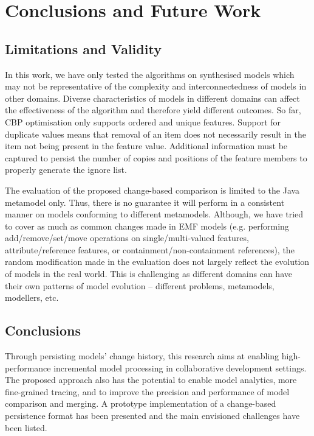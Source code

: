 \chapter{Conclusions and Future Work}

\section{Limitations and Validity}
\label{sec:limitation_and_Threat_to_validity}
In this work, we have only tested the algorithms on synthesised  models which may not be representative of the complexity and interconnectedness of models in other domains. Diverse characteristics of models in different domains can affect the effectiveness of the algorithm and therefore yield different outcomes. So far, CBP optimisation only supports ordered and unique features. Support for duplicate values means that removal of an item does not necessarily result in the item not being present in the feature value. Additional information must be captured to persist the number of copies and positions of the feature members to properly generate the ignore list. 

The evaluation of the proposed change-based comparison is limited to the Java metamodel only. Thus, there is no guarantee it will perform in a consistent manner on models conforming to different metamodels. Although, we have tried to cover as much as common changes made in EMF models (e.g. performing \textsf{add}/\textsf{remove}/\textsf{set}/\textsf{move} operations on \textsf{single}/\textsf{multi}-\textsf{valued} features, \textsf{attribute}/\textsf{reference} features, or \textsf{containment}/\textsf{non}-\textsf{containment} references), the random modification made in the evaluation does not largely reflect the evolution of models in the real world. This is challenging as different domains can have their own patterns of model evolution -- different problems, metamodels, modellers, etc.


\section{Conclusions}
\label{conclusions_overall}
Through persisting models' change history, this research aims at enabling high-performance incremental model processing in collaborative development settings. The proposed approach also has the potential to enable model analytics, more fine-grained tracing, and to improve the precision and performance of model comparison and merging. A prototype implementation of a change-based persistence format has been presented and the main envisioned challenges have been listed. 

